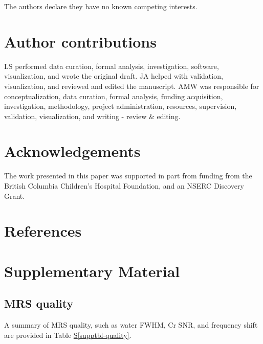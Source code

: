 \documentclass[
true
]{sn-jnl}
\newcommand*\quartosupptblref[1]{Table \hyperref[#1]{S\ref{#1}}}
\begin{document}
The authors declare they have no known competing interests.

\section*{Author contributions}\label{author-contributions}

LS performed data curation, formal analysis, investigation, software,
visualization, and wrote the original draft. JA helped with validation,
visualization, and reviewed and edited the manuscript. AMW was
responsible for conceptualization, data curation, formal analysis,
funding acquisition, investigation, methodology, project administration,
resources, supervision, validation, visualization, and writing - review
\& editing.

\section*{Acknowledgements}\label{acknowledgements}

The work presented in this paper was supported in part from funding from
the British Columbia Children's Hospital Foundation, and an NSERC
Discovery Grant.

\section*{References}\label{references}

\renewcommand{\bibsection}{}


\newpage

\section*{Supplementary Material}\label{supplementary-material}

\subsection*{MRS quality}\label{mrs-quality}

A summary of MRS quality, such as water FWHM, Cr SNR, and frequency
shift are provided in \quartosupptblref{supptbl-quality}.
\end{document}
